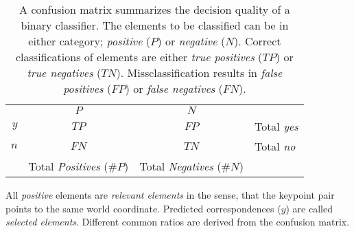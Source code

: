 {\renewcommand{\arraystretch}{1.2}%
\begin{table}[H]
\setlength\tabcolsep{0.5em}
\begin{tabular}{r|c|c|l}
    \multicolumn{1}{r}{} &
    \multicolumn{1}{c}{$P$} &
    \multicolumn{1}{c}{$N$} &
    \multicolumn{1}{l}{} \\
  \cline{2-3}
  $y$ & $TP$  & $FP$ & Total \emph{yes} \\
  \cline{2-3}
  $n$ & $FN$  & $TN$ & Total \emph{no} \\
  \cline{2-3}
    \multicolumn{1}{r}{} &
    \multicolumn{1}{c}{Total \emph{Positives} ($\#P$)} &
    \multicolumn{1}{c}{Total \emph{Negatives} ($\#N$)}
\end{tabular}
\caption[Definition of the Confusion Matrix]{A confusion matrix summarizes the decision quality of a binary classifier. The elements to be classified can be in either category; \emph{positive} ($P$) or \emph{negative} ($N$). Correct classifications of elements are either \emph{true positives} ($TP$) or \emph{true negatives} ($TN$). Missclassification results in \emph{false positives} ($FP$) or \emph{false negatives} ($FN$).}\label{tab:def_confusion_matrix}
\end{table}}

All \emph{positive} elements are \emph{relevant elements} in the sense, that the keypoint pair points to the same world coordinate.
Predicted correspondences ($y$) are called \emph{selected elements}.
Different common ratios are derived from the confusion matrix.

